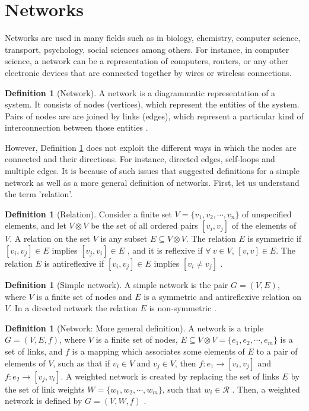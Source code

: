 \documentclass[10pt,a4paper]{article}
\theoremstyle{plain}
\theoremstyle{definition}
\newtheorem{defn}[subsection]{Definition}
\begin{document}
\section{Networks}
Networks are used in many fields such as in biology, chemistry, computer science, transport, psychology, social sciences among others. For instance, in computer science, a network can be a representation of computers, routers, or any other electronic devices that are connected together by wires or wireless connections. 
\begin{defn}[Network]
	A network is a diagrammatic representation of a system. It consists of nodes (vertices), which represent the entities of the system. Pairs of nodes are are joined by links (edges), which represent a particular kind of interconnection between those entities \citep{estrada2011structure}.
	\label{def:network}
\end{defn}
However, Definition \ref{def:network} does not exploit the different ways in which the nodes are connected and their directions. For instance, directed edges, self-loops and multiple edges. It is because of such issues that \cite{gutman2012mathematical} suggested definitions for a simple network as well as a more general definition of networks. First, let us understand the term 'relation'.

\begin{defn}[Relation]
	Consider a finite set $V=\{v_1,v_2, \cdots,v_n \}$ of unspecified elements, and let $V \otimes V$ be the set of all ordered pairs $[v_i,v_j]$ of the elements of $V$.
	A relation on the set $V$ is any subset $E \subseteq V \otimes V$. The relation $E$ is symmetric if $[v_i, v_j] \in E$ implies $[v_j, v_i] \in E$ , and it is reflexive if $\forall~ v \in V$, $[v,v] \in E$. The relation $E$ is antireflexive if $[v_i,v_j] \in E$ implies $[v_i \neq v_j]$ \citep{estrada2011structure}.
\end{defn}

\begin{defn}[Simple network]
	A simple network is the pair $G=(V,E)$, where $V$ is a finite set of nodes and $E$ is a symmetric and antireflexive relation on $V$. In a directed network the relation $E$ is non-symmetric \citep{estrada2011structure}.
\end{defn}
\begin{defn}[Network: More general definition]
	A network is a triple $ G = (V,E,f)$, where $V$ is a finite set of nodes, $E \subseteq V \otimes V = \{e_1,e_2,\cdots,e_m \} $ is a set of links, and $f$ is a mapping which associates some elements of $E$ to a pair of elements of $V$, such as that if $v_i \in V$ and $v_j \in V$, then $f: e_1 \rightarrow [v_i,v_j]$ and $f:e_2 \rightarrow [v_j,v_i]$. A weighted network is created by replacing the set of links $E$ by the set of link weights   
	$W=\{w_1,w_2,\cdots,w_m \}$, such that $w_i \in \mathcal{R}$ . Then, a weighted network is defined by $G=(V,W,f)$ \citep{estrada2011structure}.
\end{defn}
\end{document}
